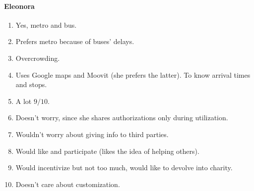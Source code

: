 \documentclass[a4paper, 10pt]{article}
\begin{document}
\paragraph*{Eleonora}
\begin{enumerate}
    \item Yes, metro and bus.
    \item Prefers metro because of buses' delays.
    \item Overcrowding.
    \item Uses Google maps and Moovit (she prefers the latter). To know arrival times and stops.
    \item A lot $9/10$.
    \item Doesn't worry, since she shares authorizations only during utilization.
    \item Wouldn't worry about giving info to third parties.
    \item Would like and participate (likes the idea of helping others).
    \item Would incentivize but not too much, would like to devolve into charity.
    \item Doesn't care about customization.
\end{enumerate}
\end{document}
